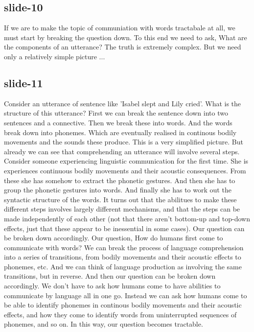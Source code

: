 \documentclass[12pt,\papersize]{extarticle}
\begin{document}
 
\subsection{slide-10}
If we are to make the topic of communiation with words tractabale at all, we must start by breaking the question down. To this end we need to ask,
What are the components of an utterance?
The truth is extremely complex.
But we need only a relatively simple picture ...
 
 
\subsection{slide-11}
Consider an utterance of sentence like 'Isabel slept and Lily cried'. What is the structure of this utterance? First we can break the sentence down into two sentences and a connective. Then we break these into words. And the words break down into phonemes. Which are eventually realised in continous bodily movements and the sounds these produce.
This is a very simplified picture. But already we can see that comprehending an utterance will involve several steps.
Consider someone experiencing linguistic communication for the first time. She is experiences continuous bodily movements and their acoustic consequences. From these she has somehow to extract the phonetic gestures. And then she has to group the phonetic gestures into words. And finally she has to work out the syntactic structure of the words.
It turns out that the abilitues to make these different steps involves largely different mechanisms, and that the steps can be made independently of each other (not that there aren’t bottom-up and top-down effects, just that these appear to be inessential in some cases). Our question can be broken down accordingly.
Our question, How do humans first come to communicate with words? We can break the process of language comprehension into a series of transitions, from bodily movements and their acoustic effects to phonemes, etc. And we can think of language production as involving the same transitions, but in reverse. And then our question can be broken down accordingly.
We don't have to ask how humans come to have abilities to communicate by language all in one go. Instead we can ask how humans come to be able to identify phonemes in continous bodily movements and their acoustic effects, and how they come to identify words from uninterrupted sequences of phonemes, and so on. In this way, our question becomes tractable.
 
 
\end{document}
